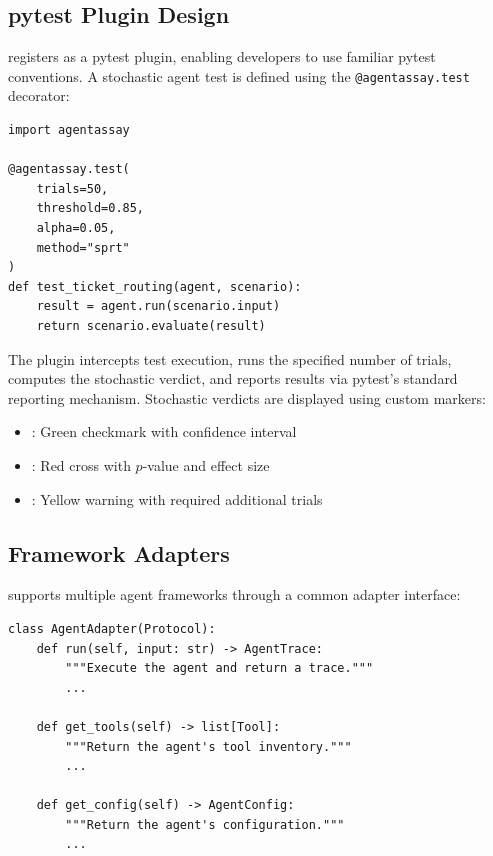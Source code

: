 \subsection{pytest Plugin Design}
\label{sec:implementation:pytest}

\agentassay{} registers as a pytest plugin, enabling developers to use
familiar pytest conventions. A stochastic agent test is defined using
the \texttt{@agentassay.test} decorator:

\begin{verbatim}
import agentassay

@agentassay.test(
    trials=50,
    threshold=0.85,
    alpha=0.05,
    method="sprt"
)
def test_ticket_routing(agent, scenario):
    result = agent.run(scenario.input)
    return scenario.evaluate(result)
\end{verbatim}

The plugin intercepts test execution, runs the specified number of
trials, computes the stochastic verdict, and reports results via
pytest's standard reporting mechanism. Stochastic verdicts are displayed
using custom markers:

\begin{itemize}[leftmargin=*]
  \item \PASS{}: Green checkmark with confidence interval
  \item \FAIL{}: Red cross with $p$-value and effect size
  \item \INCONC{}: Yellow warning with required additional trials
\end{itemize}

\subsection{Framework Adapters}
\label{sec:implementation:adapters}

\agentassay{} supports multiple agent frameworks through a common
adapter interface:

\begin{verbatim}
class AgentAdapter(Protocol):
    def run(self, input: str) -> AgentTrace:
        """Execute the agent and return a trace."""
        ...

    def get_tools(self) -> list[Tool]:
        """Return the agent's tool inventory."""
        ...

    def get_config(self) -> AgentConfig:
        """Return the agent's configuration."""
        ...
\end{verbatim}

